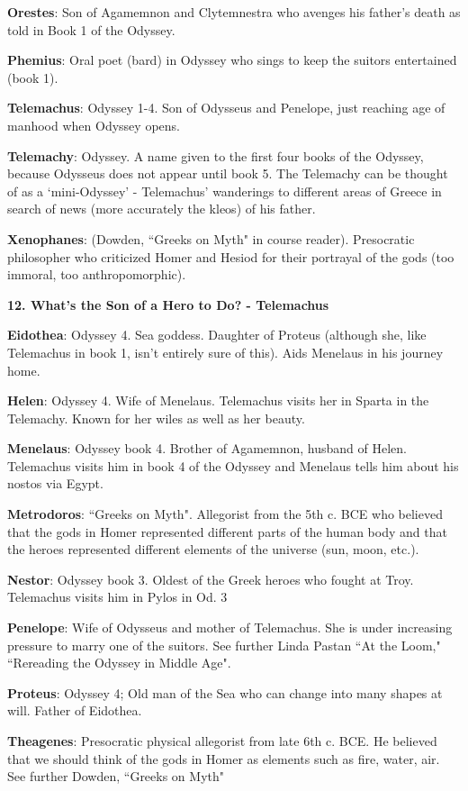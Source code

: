 \documentclass{scrartcl}
\begin{document}
\begin{multicols*}{3}
{\bf Orestes}: Son of Agamemnon and Clytemnestra who avenges his father's death as told in Book 1 of the Odyssey.

{\bf Phemius}: Oral poet (bard) in Odyssey who sings to keep the suitors entertained (book 1).

{\bf Telemachus}: Odyssey 1-4. Son of Odysseus and Penelope, just reaching age of manhood when Odyssey opens.

{\bf Telemachy}: Odyssey. A name given to the first four books of the Odyssey, because Odysseus does not appear until book 5. The Telemachy can be thought of as a `mini-Odyssey' - Telemachus' wanderings to different areas of Greece in search of news (more accurately the kleos) of his father.

{\bf Xenophanes}: (Dowden, ``Greeks on Myth" in course reader). Presocratic philosopher who criticized Homer and Hesiod for their portrayal of the gods (too immoral, too anthropomorphic).


{\bf 12. What's the Son of a Hero to Do? - Telemachus}

{\bf Eidothea}: Odyssey 4. Sea goddess. Daughter of Proteus (although she, like Telemachus in book 1, isn't entirely sure of this). Aids Menelaus in his journey home.

{\bf Helen}: Odyssey 4. Wife of Menelaus. 
Telemachus visits her in Sparta in the Telemachy. 
Known for her wiles as well as her beauty.

{\bf Menelaus}: Odyssey book 4. Brother of Agamemnon, husband of Helen. Telemachus visits him in book 4 of the Odyssey and Menelaus tells him about his nostos via Egypt.

{\bf Metrodoros}: ``Greeks on Myth". Allegorist from the 5th c. BCE who believed that the gods in Homer represented different parts of the human body and that the heroes represented different elements of the universe (sun, moon, etc.).

{\bf Nestor}: Odyssey book 3. Oldest of the Greek heroes who fought at Troy. Telemachus visits him in Pylos in Od. 3

{\bf Penelope}: Wife of Odysseus and mother of Telemachus. She is under increasing pressure to marry one of the suitors. See further Linda Pastan ``At the Loom," ``Rereading the Odyssey in Middle Age".

{\bf Proteus}: Odyssey 4; Old man of the Sea who can change into many shapes at will. Father of Eidothea.

{\bf Theagenes}: Presocratic physical allegorist from late 6th c. BCE. He believed that we should think of the gods in Homer as elements such as fire, water, air. See further Dowden, ``Greeks on Myth"



\end{multicols*}
\end{document}
